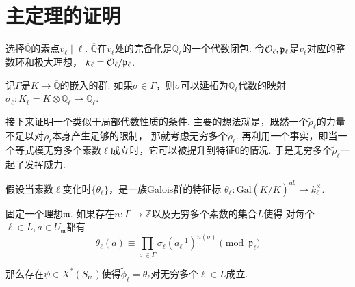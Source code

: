 \section{主定理的证明}

选择$\overline{\mathbb{Q}}$的素点$v_{\ell} \mid \ell$.
$\overline{\mathbb{Q}}$在$v_{\ell}$处的完备化是$\mathbb{Q}_{\ell}$的一个代数闭包.
令$\mathcal{O}_{\ell}, \mathfrak{p}_{\ell}$是$v_{\ell}$对应的整数环和极大理想，
$k_{\ell} = \mathcal{O}_{\ell} / \mathfrak{p}_{\ell}$.

记$\Gamma$是$K\to \overline{\mathbb{Q}}$的嵌入的群.
如果$\sigma\in \Gamma$，则$\sigma$可以延拓为$\mathbb{Q}_{\ell}$代数的映射
$\sigma_{\ell}: K_{\ell} = K\otimes \mathbb{Q}_{\ell}\to \overline{\mathbb{Q}}_{\ell}$.

接下来证明一个类似于局部代数性质的条件.
主要的想法就是，既然一个$\tilde{\rho}_{\ell}$的力量不足以对$\rho_{\ell}$本身产生足够的限制，
那就考虑无穷多个$\tilde{\rho}_{\ell}$.
再利用一个事实，即当一个等式模无穷多个素数$\ell$成立时，它可以被提升到特征$0$的情况.
于是无穷多个$\tilde{\rho}_{\ell}$一起了发挥威力.

假设当素数$\ell$变化时$\{\theta_{\ell}\}$，是一族Galois群的特征标
$\theta_{\ell}: \mathrm{Gal}(\overline{K}/K)^{ab}\to k_{\ell}^{\times}$.

\begin{cprop}
    固定一个理想$\mathfrak{m}$.
    如果存在$n:\Gamma\to \mathbb{Z}$以及无穷多个素数的集合$L$使得
    对每个$\ell\in L, a\in U_{\mathfrak{m}}$都有
    \begin{equation}
        \theta_{\ell}(a) \equiv \prod_{\sigma\in \Gamma} \sigma_{\ell}(a_{\ell}^{-1})^{n(\sigma)} \pmod{\mathfrak{p}_{\ell}}
    \end{equation}

    那么存在$\psi\in X^{*}(S_{\mathfrak{m}})$使得$\tilde{\phi}_{\ell} = \theta_{\ell}$对无穷多个$\ell\in L$成立.
\end{cprop}

